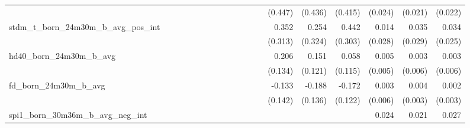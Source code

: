\begin{tabular}{lrrrrrrrrrrrrrrrrrr}
                                            &              &              &              &              &              &              &              &              &               &              &              &               &      (0.447) &      (0.436) &       (0.415) &      (0.024) &      (0.021) &       (0.022) \\ 
stdm\_t\_born\_24m30m\_b\_avg\_pos\_int     &              &              &              &              &              &              &              &              &               &              &              &               &        0.352 &        0.254 &         0.442 &        0.014 &        0.035 &         0.034 \\ 
                                            &              &              &              &              &              &              &              &              &               &              &              &               &      (0.313) &      (0.324) &       (0.303) &      (0.028) &      (0.029) &       (0.025) \\ 
hd40\_born\_24m30m\_b\_avg                  &              &              &              &              &              &              &              &              &               &              &              &               &        0.206 &        0.151 &         0.058 &        0.005 &        0.003 &         0.003 \\ 
                                            &              &              &              &              &              &              &              &              &               &              &              &               &      (0.134) &      (0.121) &       (0.115) &      (0.005) &      (0.006) &       (0.006) \\ 
fd\_born\_24m30m\_b\_avg                    &              &              &              &              &              &              &              &              &               &              &              &               &       -0.133 &       -0.188 &        -0.172 &        0.003 &        0.004 &         0.002 \\ 
                                            &              &              &              &              &              &              &              &              &               &              &              &               &      (0.142) &      (0.136) &       (0.122) &      (0.006) &      (0.003) &       (0.003) \\ 
spi1\_born\_30m36m\_b\_avg\_neg\_int        &              &              &              &              &              &              &              &              &               &              &              &               &              &              &               &        0.024 &        0.021 &         0.027 \\ 

\end{tabular}
